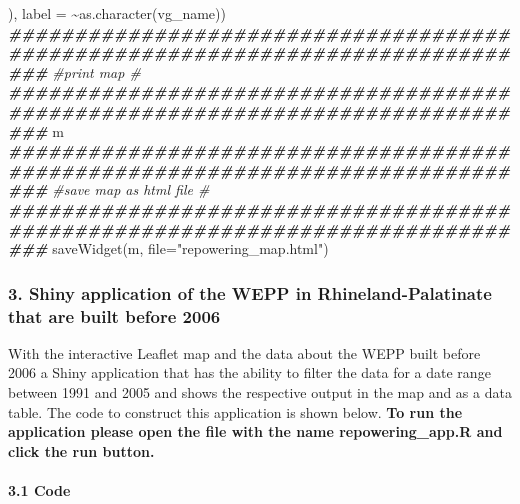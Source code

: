 \documentclass[
]{article}
\newenvironment{Shaded}{\begin{snugshade}}{\end{snugshade}}
\newcommand{\AttributeTok}[1]{\textcolor[rgb]{0.77,0.63,0.00}{#1}}
\newcommand{\CommentTok}[1]{\textcolor[rgb]{0.56,0.35,0.01}{\textit{#1}}}
\newcommand{\DocumentationTok}[1]{\textcolor[rgb]{0.56,0.35,0.01}{\textbf{\textit{#1}}}}
\newcommand{\FunctionTok}[1]{\textcolor[rgb]{0.00,0.00,0.00}{#1}}
\newcommand{\NormalTok}[1]{#1}
\newcommand{\SpecialCharTok}[1]{\textcolor[rgb]{0.00,0.00,0.00}{#1}}
\newcommand{\StringTok}[1]{\textcolor[rgb]{0.31,0.60,0.02}{#1}}
\begin{document}
\begin{Shaded}
\begin{Highlighting}[]
\NormalTok{             ),}
             \AttributeTok{label =} \SpecialCharTok{\textasciitilde{}}\FunctionTok{as.character}\NormalTok{(vg\_name))}
\DocumentationTok{\#\#\#\#\#\#\#\#\#\#\#\#\#\#\#\#\#\#\#\#\#\#\#\#\#\#\#\#\#\#\#\#\#\#\#\#\#\#\#\#\#\#\#\#\#\#\#\#\#\#\#\#\#\#\#\#\#\#\#\#\#\#\#\#\#\#\#\#\#\#\#\#\#\#\#\#\#\#\#}
\CommentTok{\#print map                                                                    \#}
\DocumentationTok{\#\#\#\#\#\#\#\#\#\#\#\#\#\#\#\#\#\#\#\#\#\#\#\#\#\#\#\#\#\#\#\#\#\#\#\#\#\#\#\#\#\#\#\#\#\#\#\#\#\#\#\#\#\#\#\#\#\#\#\#\#\#\#\#\#\#\#\#\#\#\#\#\#\#\#\#\#\#\#}
\NormalTok{m}
\DocumentationTok{\#\#\#\#\#\#\#\#\#\#\#\#\#\#\#\#\#\#\#\#\#\#\#\#\#\#\#\#\#\#\#\#\#\#\#\#\#\#\#\#\#\#\#\#\#\#\#\#\#\#\#\#\#\#\#\#\#\#\#\#\#\#\#\#\#\#\#\#\#\#\#\#\#\#\#\#\#\#\#}
\CommentTok{\#save map as html file                                                        \#}
\DocumentationTok{\#\#\#\#\#\#\#\#\#\#\#\#\#\#\#\#\#\#\#\#\#\#\#\#\#\#\#\#\#\#\#\#\#\#\#\#\#\#\#\#\#\#\#\#\#\#\#\#\#\#\#\#\#\#\#\#\#\#\#\#\#\#\#\#\#\#\#\#\#\#\#\#\#\#\#\#\#\#\#}
\FunctionTok{saveWidget}\NormalTok{(m, }\AttributeTok{file=}\StringTok{"repowering\_map.html"}\NormalTok{)}
\end{Highlighting}
\end{Shaded}

\hypertarget{shiny-application-of-the-wepp-in-rhineland-palatinate-that-are-built-before-2006}{%
\subsubsection{3. Shiny application of the WEPP in Rhineland-Palatinate
that are built before
2006}\label{shiny-application-of-the-wepp-in-rhineland-palatinate-that-are-built-before-2006}}

With the interactive Leaflet map and the data about the WEPP built
before 2006 a Shiny application that has the ability to filter the data
for a date range between 1991 and 2005 and shows the respective output
in the map and as a data table. The code to construct this application
is shown below. \textbf{To run the application please open the file with
the name repowering\_app.R and click the run button.}

\hypertarget{code}{%
\paragraph{3.1 Code}\label{code}}
\end{document}
